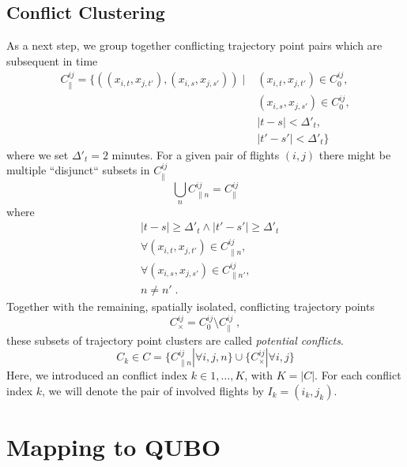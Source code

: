 \documentclass[aps,pra,twocolumn,10pt]{revtex4-1}
\begin{document}
\subsection{Conflict Clustering}
As a next step, we group together conflicting trajectory point pairs which are subsequent in time
\begin{align*}
    C^{ij}_\parallel = \{ ((x_{i, t},  x_{j, t'}),  (x_{i, s},  x_{j, s'})) \; | \; & (x_{i, t},  x_{j, t'}) \in C^{ij}_0, \\
                                                                                    & (x_{i, s},  x_{j, s'}) \in C^{ij}_0, \\ 
                                                                                    & |t - s| < \Delta'_t,  \\
                                                                                    & |t' - s'| < \Delta'_t \}
\end{align*}
where we set $\Delta'_t = 2$ minutes.
For a given pair of flights $(i, j)$ there might be multiple ``disjunct`` subsets in $C^{ij}_\parallel$
\begin{equation*}
    \bigcup_{n} C^{ij}_{\parallel n} = C^{ij}_\parallel
\end{equation*}
where
\begin{align*}
    & |t - s| \geq \Delta'_t \land |t' - s'| \geq \Delta'_t \\
    & \forall (x_{i, t},  x_{j, t'}) \in C^{ij}_{\parallel n}, \\
    & \forall (x_{i, s},  x_{j, s'}) \in C^{ij}_{\parallel n'}, \\
    & n \neq n' \; .
\end{align*}
Together with the remaining, spatially isolated, conflicting trajectory points
\begin{equation*}
    C^{ij}_{\times} = C^{ij}_0 \setminus C^{ij}_\parallel \; ,
\end{equation*}
these subsets of trajectory point clusters are called \emph{potential conflicts}.
\begin{equation*}
    C_k \in C = \{ C^{ij}_{\parallel n} | \forall i, j, n\} \cup  \{C^{ij}_{\times} | \forall i, j\}
\end{equation*}
Here, we introduced an conflict index $k\in{1, \dots, K}$, with $K = |C|$.
For each conflict index $k$, we will denote the pair of involved flights by $I_k = (i_k, j_k)$.

\section{Mapping to QUBO}



\end{document}
